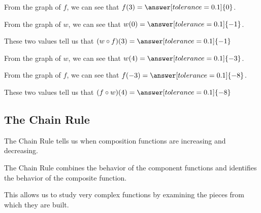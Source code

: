 \documentclass{ximera}
\begin{document}
\begin{question}

From the graph of $f$, we can see that $f(3) = \answer[tolerance=0.1]{0}$.

From the graph of $w$, we can see that $w(0) = \answer[tolerance=0.1]{-1}$.

These two values tell us that $(w \circ f)(3) = \answer[tolerance=0.1]{-1}$

\end{question}







\begin{question}

From the graph of $w$, we can see that $w(4) = \answer[tolerance=0.1]{-3}$.

From the graph of $f$, we can see that $f(-3) = \answer[tolerance=0.1]{-8}$.

These two values tell us that $(f \circ w)(4) = \answer[tolerance=0.1]{-8}$

\end{question}

























\subsection*{The Chain Rule}


The Chain Rule tells us when composition functions are increasing and decreasing.

The Chain Rule combines the behavior of the component functions and identifies the behavior of the composite function.

This allows us to study very complex functions by examining the pieces from which they are built.
\end{document}
